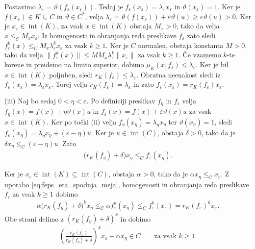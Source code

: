 \documentclass[mat2, tisk]{fmfdelo}
\begin{document}
\begin{dokaz}
  Postavimo
  $\lambda_\varepsilon
  =\vartheta(f_\varepsilon(x_\varepsilon))$.
  Tedaj je
  $f_\varepsilon(x_\varepsilon)
  =\lambda_\varepsilon x_\varepsilon$ in
  $\vartheta(x_\varepsilon)=1$.
  Ker je $f(x_\varepsilon)\in K\subseteq C$ in
  $\vartheta\in C^*$, velja
  $\lambda_\varepsilon=\vartheta(f(x_\varepsilon))
  +\varepsilon\vartheta(u)\geq\varepsilon\vartheta(u)>0$.
  Ker je $x_\varepsilon\in\operatorname{int}(K)$, za vsak
  $x\in\operatorname{int}(K)$ obstaja $M_x>0$, tako da velja
  $x\leq_C M_x x_\varepsilon$. Iz homogenosti in ohranjanja reda
  preslikave $f_\varepsilon$ zato sledi
  $f_\varepsilon^k(x)\leq_C M_x\lambda_\varepsilon^k x_\varepsilon$
  za vsak $k\geq1$. Ker je $C$ normalen, obstaja konstanta $M>0$, tako da velja
  $\|f_\varepsilon^k(x)\|\leq M M_x\lambda_\varepsilon^k
  \|x_\varepsilon\|$ za vsak $k\geq1$.
  Če vzamemo $k$-te korene in preidemo na limito superior,
  dobimo $\mu_K(x,f_\varepsilon)\leq\lambda_\varepsilon$.
  Ker je bil $x\in\operatorname{int}(K)$ poljuben, sledi
  $r_K(f_\varepsilon)\leq\lambda_\varepsilon$.
  Obratna neenakost sledi iz
  $f_\varepsilon(x_\varepsilon)=\lambda_\varepsilon x_\varepsilon$.
  Torej velja $r_K(f_\varepsilon)=\lambda_\varepsilon$ in zato
  $f_\varepsilon(x_\varepsilon)=r_K(f_\varepsilon)x_\varepsilon$.

  (iii) Naj bo sedaj $0<\eta<\varepsilon$. Po definiciji preslikav
  $f_\eta$ in $f_\varepsilon$ velja
  $f_\eta(x)=f(x)+\eta\vartheta(x)u$ in
  $f_\varepsilon(x)=f(x)+\varepsilon\vartheta(x)u$
  za vsak $x\in\operatorname{int}(K)$.
  Ker po točki (ii) velja
  $f_\eta(x_\eta)=\lambda_\eta x_\eta$
  ter $\vartheta(x_\eta)=1$, sledi
  $f_\varepsilon(x_\eta)=\lambda_\eta x_\eta+(\varepsilon-\eta)u$.
  Ker je $u\in\operatorname{int}(C)$, obstaja $\delta>0$, tako da je
  $\delta x_\eta\leq_C(\varepsilon-\eta)u$. Zato
  \begin{align}
  \bigl(r_K(f_\eta)+\delta\bigr)x_\eta
  \leq_C
  f_\varepsilon(x_\eta).
  \label{eq:feps_eta_spodnja_meja}
  \end{align}

  Ker je $x_\varepsilon\in\operatorname{int}(K)
  \subseteq\operatorname{int}(C)$, obstaja $\alpha>0$, tako da je
  $\alpha x_\eta\leq_Cx_\varepsilon$.
  Z uporabo \eqref{eq:feps_eta_spodnja_meja}, homogenosti in ohranjanja
  reda preslikave $f_\varepsilon$ za vsak $k\geq1$ dobimo
  \begin{align*}
  \alpha\bigl(r_K(f_\eta)+\delta\bigr)^k x_\eta
  \leq_C
  \alpha f_\varepsilon^k(x_\eta)
  \leq_C
  f_\varepsilon^k(x_\varepsilon)
  =
  r_K(f_\varepsilon)^k x_\varepsilon.
  \end{align*}
  Obe strani delimo z $(r_K(f_\eta)+\delta)^k$ in dobimo
  \begin{align}
  \left(
  \frac{r_K(f_\varepsilon)}
  {r_K(f_\eta)+\delta}
  \right)^k
  x_\varepsilon
  -
  \alpha x_\eta
  \in C
  \qquad
  \text{za vsak }k\geq1.
  \label{eq:primerjava_feps_feta}
  \end{align}


\end{dokaz}
\end{document}
